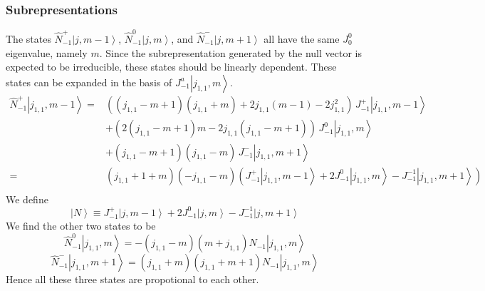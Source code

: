 \documentclass[10pt,a4paper]{article}
\numberwithin{equation}{section}
\newcommand{\ket}[1]{\left| #1 \right\rangle}
\begin{document}
\subsubsection*{Subrepresentations}

The states $\hat{N}^{+}_{-1}\ket{j,m-1}$, $\hat{N}^{0}_{-1}\ket{j,m}$, and $\hat{N}^{-}_{-1} \ket{j,m+1}$ 
all have the same $J^{0}_{0}$ eigenvalue, namely $m$. Since the subrepresentation generated by the null vector is 
expected to be irreducible, these states should be linearly dependent. These states can be expanded in the basis of 
$J^{a}_{-1}\ket{j_{1,1},m}$. 
\begin{equation}
    \begin{aligned}
        \hat{N}^{+}_{-1} \ket{j_{1,1},m-1} = & ((j_{1,1}-m+1)(j_{1,1}+m) +2 j_{1,1}(m-1) -2 j_{1,1}^2) \, J^{+}_{-1}  \ket{j_{1,1},m-1} \\
        & + (2(j_{1,1}-m+1)m-2j_{1,1}(j_{1,1}-m+1)) \, J^{0}_{-1}  \ket{j_{1,1},m} \\
        & + (j_{1,1}-m+1)(j_{1,1}-m) \, J^{-}_{-1} \ket{j_{1,1},m+1}\\
        = & (j_{1,1}+1+m)(-j_{1,1}-m)\left( J^{+}_{-1} \ket{j_{1,1},m-1} + 2 J^{0}_{-1} \ket{j_{1,1},m} - J^{-1}_{-1} \ket{j_{1,1},m+1} \right)\\
    \end{aligned}
\end{equation}
We define 
\begin{equation}
    \ket{N} \equiv J^{+}_{-1} \ket{j,m-1} + 2 J^{0}_{-1} \ket{j,m} - J^{-1}_{-1} \ket{j,m+1}
\end{equation}
We find the other two states to be
\begin{equation}
    \hat{N}^{0}_{-1} \ket{j_{1,1},m} = -(j_{1,1}-m)(m+j_{1,1}) N_{-1} \ket{j_{1,1},m}
\end{equation}
\begin{equation}
    \hat{N}^{-}_{-1} \ket{j_{1,1},m+1} =  (j_{1,1}+m)(j_{1,1}+m+1) N_{-1} \ket{j_{1,1},m}
\end{equation}
Hence all these three states are propotional to each other. 
\end{document}
